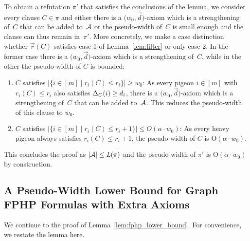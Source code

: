 \documentclass{theoretics}
\newcommand{\bigoh}[1]{\mathrm{O} ( #1 )}
\newcommand{\N}         {\mathbb{N}}
\providecommand{\abs}[1]{\lvert#1\rvert}
\providecommand{\Abs}[1]{\bigl\lvert#1\bigr\rvert}
\newcommand{\set}[1]{\{ #1 \}}
\newcommand{\setdescr}[3][\mid]{\set{ #2 #1 #3 }}
\newcommand{\setsize}[1]{\lvert#1\rvert}
\newcommand{\disjointunion}{\overset{.}{\cup}}
\newcommand{\reflem}[1]{Lemma~\ref{#1}}
\newenvironment{restatablelem}[1]
  {\renewcommand\theinnercustomthm{#1}\innercustomthm}
  {\endinnercustomthm}
\newcommand{\refpi}{\pi}
\newcommand{\genericformsmall}[2]{\mathit{#1}( #2 )}
\newcommand{\length}[1]{\genericformsmall{L}{#1}}
\newcommand{\width}[2][]{\genericformsmall{W_{#1}}{#2}}
\newcommand{\formulaformat}[1]{\mathit{#1}}
\newcommand{\graphfphpnot}[1][G]{\formulaformat{FPHP}({#1})}
\newcommand{\heavy}{heavy\xspace}
\newcommand{\GFPHP}{G\text{-}FPHP}
\renewcommand{\GFPHP}{\graphfphpnot[G]}
\renewcommand{\deg}[2][XXXXXXXXXXXX]{\Delta_{#1}(#2)}
\newcommand{\diff}{\xi}
\newcommand{\cdiff}{4}
\newcommand{\GdegMax}{\Delta}
\newcommand{\V}[1][]{V_{#1}}
\newcommand{\Vp}{\V[P]}
\newcommand{\Vh}{\V[H]}
\newcommand{\Ax}{\ensuremath\mathcal{A}}
\newcommand{\thr}[1]{ \ensuremath d_{{#1}} }
\newcommand{\vecthr}{\vec{d}}
\newcommand{\vecthrdef}[1]{\vecthr = \left(\thr{1}, \ldots, \thr{#1}\right)}
\newcommand{\adv}[1]{\delta_{{#1}}}
\newcommand{\vecadv}{\vec{\delta}}
\newcommand{\vecadvdef}[1]{\vecadv = \left(\adv{1}, \ldots, \adv{#1}\right)}
\newcommand{\fakeaxiom}{$\bigl( w_0, \vecthr \bigr)$-axiom\xspace}
\newcommand{\pseudowidth}{pseudo-width\xspace}
\newcommand{\PSEUDOWIDTH}{Pseudo-Width\xspace}
\renewcommand{\width}[1]{\ensuremath w_{\vecthr,\vecadv}( #1 )}
\newcommand{\ri}[1]{r_{#1}}
\newcommand{\riof}[2]{r_{#2}(#1)}
\newcommand{\vecrof}[1]{\vec{r}(#1)}
\newcommand{\squeezesubsection}[1]{\subsection{#1}}
\numberwithin{equation}{section}
\begin{document}
To obtain a refutation $\refpi'$ that satisfies the conclusions of the lemma,
we consider every clause $C \in \refpi$ and either there is a
\fakeaxiom which is a strengthening of~$C$ that can be added to~$\Ax$ or
the \pseudowidth of~$C$ is small enough and the clause can thus remain
in~$\refpi'$.  More concretely, we make a case distinction whether
$\vecrof{C}$ satisfies case 1 of \reflem{lem:filter} or only case
2. In the former case
there is a \fakeaxiom which is a strengthening of~$C$, while in the
other
the \pseudowidth of $C$ is bounded: \begin{enumerate}
  \item
    $C$ satisfies 
    $\Abs{ \setdescr{ i \in [m]}{ \riof{C}{i} \le \ri{i} } } \ge
    w_0$: As every pigeon $i \in [m]$
    with $\riof{C}{i} \le \ri{i}$
    also satisfies $\deg[C]{i} \ge \thr{i}$, there is a \fakeaxiom
    which is a strengthening of~$C$ that can be added to~$\Ax$. This
    reduces the \pseudowidth of this clause to $w_0$.
  \item
    $C$ satisfies 
    $\Abs{ \setdescr{ i \in [m] }{ \riof{C}{i} \le \ri{i} + 1 } } \le
    O(\alpha \cdot w_0)$:  As every \heavy pigeon always
    satisfies $\riof{C}{i} \le \ri{i} + 1$, the \pseudowidth of $C$ is
    $\bigoh{\alpha \cdot w_0}$.
\end{enumerate}
This concludes the proof as 
$\setsize{\Ax} \leq \length{\refpi}$ 
and the \pseudowidth of $\refpi'$ is
$\bigoh{\alpha \cdot w_0}$ by construction.


\squeezesubsection{A \PSEUDOWIDTH Lower Bound for
  Graph FPHP Formulas with Extra Axioms}
\label{sec:fphp_lower_bound}

We continue to the proof of \reflem{lem:fphp_lower_bound}. For
convenience, we restate the lemma here.

\end{document}

